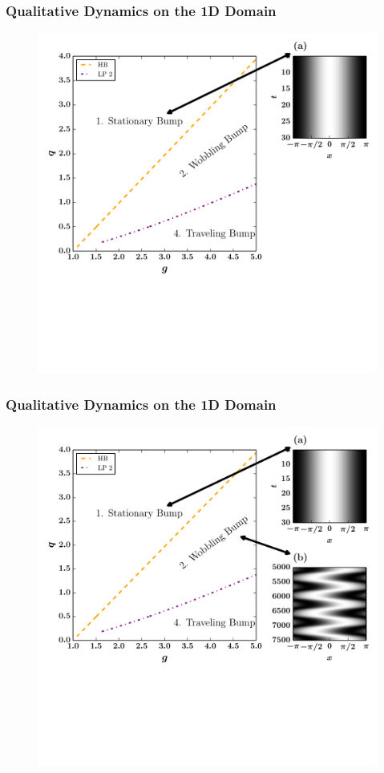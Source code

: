 \documentclass{beamer}
\begin{document}
\begin{frame}
\frametitle{Qualitative Dynamics on the 1D Domain}
\begin{figure}
 \includegraphics[width=.7\textwidth]{oned_full_2par1.pdf}
\end{figure}
\end{frame}


\begin{frame}
\frametitle{Qualitative Dynamics on the 1D Domain}
\begin{figure}
 \includegraphics[width=.7\textwidth]{oned_full_2par2.pdf}
\end{figure}
\end{frame}
\end{document}
